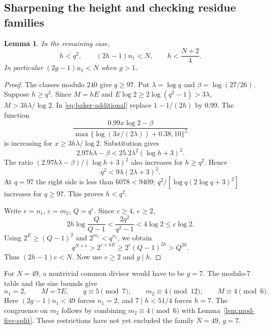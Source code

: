 \documentclass[11pt]{article}
\newtheorem{lemma}{Lemma}
\begin{document}
\subsection{Sharpening the height and checking residue families}
\begin{lemma}\label{lem:sharp-h}
In the remaining case,
\[
h<q^2,\qquad (2h-1)n_1<N,\qquad
h<\frac{N+2}{4}.
\]
In particular $(2g-1)n_1<N$ when $g>1$.
\end{lemma}
\begin{proof}
The classes modulo $240$ give $q\ge97$. Put $\lambda=\log q$ and
$\beta=\log(27/26)$. Suppose $h\ge q^2$.
Since $M=hE$ and $E\log2\ge2\log(q^2-1)>3\lambda$,
$M>3h\lambda/\log2$.
In \eqref{eq:baker-additional} replace $1-1/(2h)$ by $0.99$.
The function
\[
\frac{0.99x\log2-\beta}
 {\max\{\log(3x/(2\lambda))+0.38,10\}^2}
\]
is increasing for $x\ge3h\lambda/\log2$. Substitution gives
\[
2.97h\lambda-\beta
 <25.2\lambda^2(\log h+3)^2.
\]
The ratio $(2.97h\lambda-\beta)/(\log h+3)^2$ also increases
for $h\ge q^2$. Hence
\[
q^2<9\lambda(2\lambda+3)^2.
\]
At $q=97$ the right side is less than $6078<9409$;
$q^2/[\log q(2\log q+3)^2]$ increases for $q\ge97$.
This proves $h<q^2$.

Write $e=n_1$, $c=m_2$, $Q=q^e$. Since $c\ge4$, $e\ge2$,
\[
2h\log\frac{Q}{Q-1}
 <\frac{2q^2}{q^2-1}<4\log2\le c\log2.
\]
Using $2^E\ge(Q-1)^2$ and $2^{m_1}<q^{n_2}$, we obtain
\[
q^{N+e}>2^{c+hE}\ge2^c(Q-1)^{2h}>Q^{2h}.
\]
Thus $(2h-1)e<N$. Now use $e\ge2$ and $g\mid h$.
\end{proof}

For $N=49$, a nontrivial common divisor would have to be $g=7$.
The modulo-$7$ table and the size bounds give
\[
n_1=2,\qquad M=7E,\qquad
q\equiv5\pmod7,\qquad m_2\equiv4\pmod{12},\qquad M\equiv4\pmod6.
\]
Here $(2g-1)n_1<49$ forces $n_1=2$, and $7\mid h<51/4$
forces $h=7$. The congruence on $m_2$ follows by combining
$m_2\equiv4\pmod6$ with Lemma~\ref{lem:mod-five-split}.
These restrictions have not yet excluded the family $N=49$, $g=7$.
\end{document}
